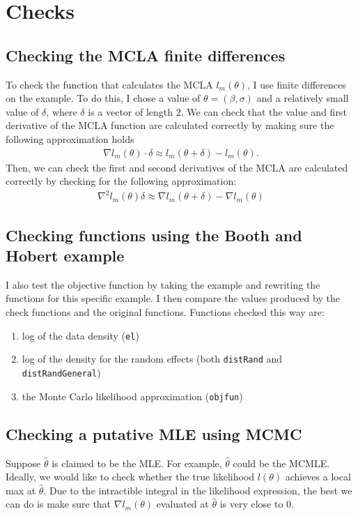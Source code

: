 \documentclass{article}
\begin{document}
\section{Checks}
\subsection{Checking the MCLA finite differences}
To check the function that calculates the MCLA $l_m(\theta)$, I use finite differences on the \citet{booth:hobert:1999} example. To do this, I chose a value of $\theta=(\beta,\sigma)$ and a relatively small value of $\delta$, where $\delta$ is a vector of length $2$. We can check that the value and first derivative of the MCLA function are calculated correctly by making sure the following approximation holds
\begin{align}
\nabla l_m (\theta)  \cdot \delta \approx l_m(\theta+\delta)-l_m(\theta).
\end{align} 
Then, we can check the first and second derivatives of the MCLA are calculated correctly by checking for the following approximation:
\begin{align}
\nabla^2 l_m (\theta) \delta \approx \nabla l_m (\theta+\delta)-\nabla l_m (\theta)
\end{align}

\subsection{Checking  functions using the Booth and Hobert example}
I also test the objective function by taking the  \citet{booth:hobert:1999} example and rewriting the functions for this specific example. I then compare the values produced by the check functions and the original functions. Functions checked this way are:
\begin{enumerate}
\item log of the data density (\texttt{el})
\item log of the density for the random effects (both \texttt{distRand} and \texttt{distRandGeneral})
\item the Monte Carlo likelihood approximation (\texttt{objfun})
\end{enumerate}

\subsection{Checking a putative MLE using MCMC}

Suppose $\hat{\theta}$ is claimed to be the MLE. For example, $\hat{\theta}$ could be the MCMLE.  Ideally, we would like to check whether the true likelihood $l(\theta)$ achieves a local max at $\hat{\theta}$.  Due to the intractible integral in the likelihood expression, the best we can do is make sure that  $\nabla l_m(\theta)$ evaluated at $\hat{\theta}$ is very close to $0$. 
\end{document}
